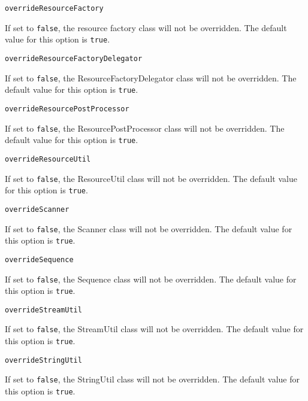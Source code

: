 \noindent\texttt{overrideResourceFactory}
\begin{myindentpar}{1cm}
If set to \texttt{false}, the resource factory class will not be overridden. The default value for this option is \texttt{true}.
\end{myindentpar}

\noindent\texttt{overrideResourceFactoryDelegator}
\begin{myindentpar}{1cm}
If set to \texttt{false}, the ResourceFactoryDelegator class will not be overridden. The default value for this option is \texttt{true}.
\end{myindentpar}

\noindent\texttt{overrideResourcePostProcessor}
\begin{myindentpar}{1cm}
If set to \texttt{false}, the ResourcePostProcessor class will not be overridden. The default value for this option is \texttt{true}.
\end{myindentpar}

\noindent\texttt{overrideResourceUtil}
\begin{myindentpar}{1cm}
If set to \texttt{false}, the ResourceUtil class will not be overridden. The default value for this option is \texttt{true}.
\end{myindentpar}

\noindent\texttt{overrideScanner}
\begin{myindentpar}{1cm}
If set to \texttt{false}, the Scanner class will not be overridden. The default value for this option is \texttt{true}.
\end{myindentpar}

\noindent\texttt{overrideSequence}
\begin{myindentpar}{1cm}
If set to \texttt{false}, the Sequence class will not be overridden. The default value for this option is \texttt{true}.
\end{myindentpar}

\noindent\texttt{overrideStreamUtil}
\begin{myindentpar}{1cm}
If set to \texttt{false}, the StreamUtil class will not be overridden. The default value for this option is \texttt{true}.
\end{myindentpar}

\noindent\texttt{overrideStringUtil}
\begin{myindentpar}{1cm}
If set to \texttt{false}, the StringUtil class will not be overridden. The default value for this option is \texttt{true}.
\end{myindentpar}


